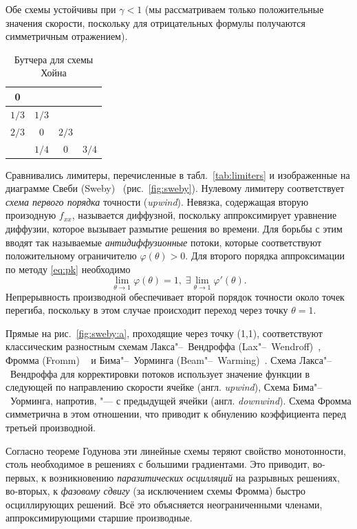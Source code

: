 Обе схемы устойчивы при \(\gamma < 1\) (мы рассматриваем только положительные значения скорости,
поскольку для отрицательных формулы получаются симметричным отражением).

\begin{table}
	\vspace{-10pt}
	\caption{Бутчера для схемы Хойна}\label{tab:bootcher}
	\vspace{-10pt}
	\centering
		\begin{tabular}{| c | c | c | c |}
			\hline
			0 & & & \\ \hline
			\(1/3\) & \(1/3\) & & \\ \hline
			\(2/3\) & 0 & \(2/3\) & \\ \hline
			& \(1/4\) & 0 & \(3/4\) \\ \hline
		\end{tabular}
	\vspace{-10pt}
\end{table}

Сравнивались лимитеры, перечисленные в табл.~\ref{tab:limiters} и изображенные на диаграмме Свеби (Sweby)~\cite{Sweby1984} (рис.~\ref{fig:sweby}). 
Нулевому лимитеру соответствует \textit{схема первого порядка} точности (\textit{upwind}).
Невязка, содержащая вторую произодную \(f_{xx}\), называется диффузной, поскольку аппроксимирует уравнение диффузии,
которое вызывает размытие решения во времени. Для борьбы с этим вводят так называемые \textit{антидиффузионные} потоки,
которые соответствуют положительному ограничителю \(\varphi(\theta)>0\).
Для второго порядка аппроксимации по методу \eqref{eq:pk} необходимо
\[ \lim_{\theta\to1}{\varphi(\theta)} = 1, \; \exists \lim_{\theta\to1}{\varphi'(\theta)}. \]
Непрерывность производной обеспечивает второй порядок точности около точек перегиба,
поскольку в этом случае происходит переход через точку \(\theta=1\).

Прямые на рис.~\ref{fig:sweby:a}, проходящие через точку (1,1), соответствуют классическим разностным схемам
Лакса"--~Вендроффа (Lax"--~Wendroff)~\cite{Lax1960}, Фромма (Fromm) ~\cite{Fromm1968} и Бима"--~Уорминга (Beam"--~Warming)~\cite{Warming1975}.
Схема Лакса"--~Вендроффа для корректировки потоков использует значение функции в следующей по направлению скорости ячейке
(англ. \textit{upwind}), Схема Бима"--~Уорминга, напротив, "--- с предыдущей ячейки (англ. \textit{downwind}).
Схема Фромма симметрична в этом отношении, что приводит к обнулению коэффициента перед третьей производной.

Согласно теореме Годунова эти линейные схемы теряют свойство монотонности, столь необходимое в решениях с большими градиентами.
Это приводит, во-первых, к возникновению \textit{паразитических осцилляций} на разрывных решениях,
во-вторых, к \textit{фазовому сдвигу} (за исключением схемы Фромма) быстро осциллирующих решений.
Всё это объясняется неограниченными членами, аппроксимирующими старшие производные.

